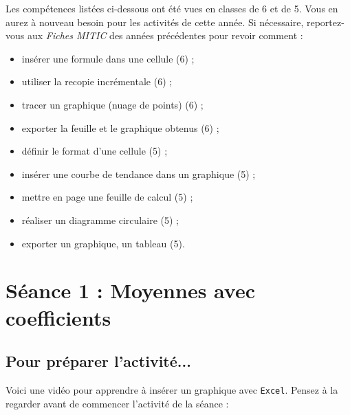 \vspace{12pt}

Les compétences listées ci-dessous ont été vues en classes de 6 et de 5. Vous en aurez à nouveau besoin pour les activités de cette année. Si nécessaire, reportez-vous aux \emph{Fiches MITIC} des années précédentes pour revoir comment :  

\begin{itemize}
\item insérer une formule dans une cellule (6) ;
\item utiliser la recopie incrémentale (6) ;
\item tracer un graphique (nuage de points) (6) ;
\item exporter la feuille et le graphique obtenus (6) ;
\item définir le format d'une cellule (5) ;
\item insérer une courbe de tendance dans un graphique (5) ;
\item mettre en page une feuille de calcul (5) ;
\item réaliser un diagramme circulaire (5) ;
\item exporter un graphique, un tableau (5).
\end{itemize}









%
%
%
%


\section{Séance 1 : Moyennes avec coefficients}\label{ficheTableur4e1}

\subsection{Pour préparer l'activité...}

\vspace{10pt}

Voici une vidéo pour apprendre à insérer un graphique avec \texttt{Excel}. Pensez à la regarder avant de commencer l'activité de la séance :

\begin{center}
\end{center}

